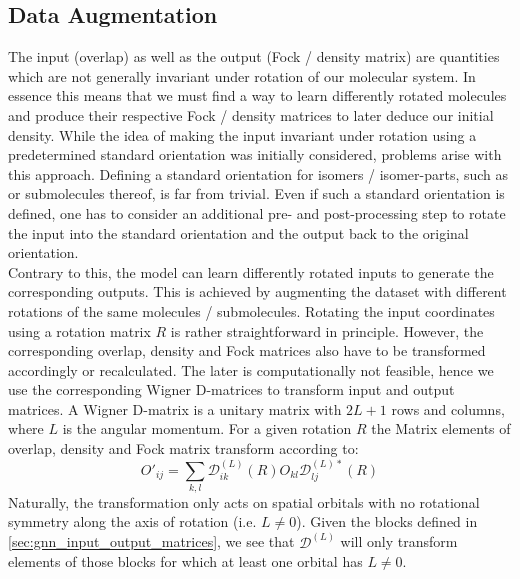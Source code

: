 \subsection{Data Augmentation}
\label{subsec:gnn_data_augmentation}
The input (overlap) as well as the output (Fock / density matrix) are quantities which are not generally invariant under rotation of our molecular system. In essence this means that we must find a way to learn differently rotated molecules and produce their respective Fock / density matrices to later deduce our initial density. While the idea of making the input invariant under rotation using a predetermined standard orientation was initially considered, problems arise with this approach. Defining a standard orientation for isomers / isomer-parts, such as  or submolecules thereof, is far from trivial. Even if such a standard orientation is defined, one has to consider an additional pre- and post-processing step to rotate the input into the standard orientation and the output back to the original orientation. \\
Contrary to this, the model can learn differently rotated inputs to generate the corresponding outputs. This is achieved by augmenting the dataset with different rotations of the same molecules / submolecules. Rotating the input coordinates using a rotation matrix $R$ is rather straightforward in principle. However, the corresponding overlap, density and Fock matrices also have to be transformed accordingly or recalculated. The later is computationally not feasible, hence we use the corresponding Wigner D-matrices to transform input and output matrices. 
A Wigner D-matrix is a unitary matrix with $2L + 1$ rows and columns, where $L$ is the angular momentum. For a given rotation $R$ the Matrix elements of overlap, density and Fock matrix transform according to:
\begin{equation}
    \label{eq:wigner_d_transform}
    O'_{ij} = \sum_{k,l} \mathcal{D}^{(L)}_{ik}(R) O_{kl} \mathcal{D}^{(L)*}_{lj}(R)
\end{equation}
Naturally, the transformation only acts on spatial orbitals with no rotational symmetry along the axis of rotation (i.e. $L \neq 0$). Given the blocks defined in \autoref{sec:gnn_input_output_matrices}, we see that $\mathcal{D}^{(L)}$ will only transform elements of those blocks for which at least one orbital has $L \neq 0$. \\


